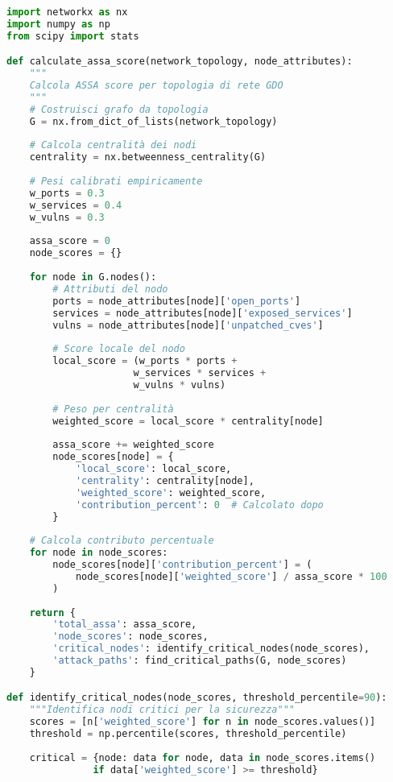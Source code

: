 \begin{lstlisting}[language=Python, caption=Calcolo ASSA per Infrastrutture Distribuite]
import networkx as nx
import numpy as np
from scipy import stats

def calculate_assa_score(network_topology, node_attributes):
    """
    Calcola ASSA score per topologia di rete GDO
    """
    # Costruisci grafo da topologia
    G = nx.from_dict_of_lists(network_topology)
    
    # Calcola centralità dei nodi
    centrality = nx.betweenness_centrality(G)
    
    # Pesi calibrati empiricamente
    w_ports = 0.3
    w_services = 0.4
    w_vulns = 0.3
    
    assa_score = 0
    node_scores = {}
    
    for node in G.nodes():
        # Attributi del nodo
        ports = node_attributes[node]['open_ports']
        services = node_attributes[node]['exposed_services']
        vulns = node_attributes[node]['unpatched_cves']
        
        # Score locale del nodo
        local_score = (w_ports * ports + 
                      w_services * services + 
                      w_vulns * vulns)
        
        # Peso per centralità
        weighted_score = local_score * centrality[node]
        
        assa_score += weighted_score
        node_scores[node] = {
            'local_score': local_score,
            'centrality': centrality[node],
            'weighted_score': weighted_score,
            'contribution_percent': 0  # Calcolato dopo
        }
    
    # Calcola contributo percentuale
    for node in node_scores:
        node_scores[node]['contribution_percent'] = (
            node_scores[node]['weighted_score'] / assa_score * 100
        )
    
    return {
        'total_assa': assa_score,
        'node_scores': node_scores,
        'critical_nodes': identify_critical_nodes(node_scores),
        'attack_paths': find_critical_paths(G, node_scores)
    }

def identify_critical_nodes(node_scores, threshold_percentile=90):
    """Identifica nodi critici per la sicurezza"""
    scores = [n['weighted_score'] for n in node_scores.values()]
    threshold = np.percentile(scores, threshold_percentile)
    
    critical = {node: data for node, data in node_scores.items() 
               if data['weighted_score'] >= threshold}
    

\end{lstlisting}

